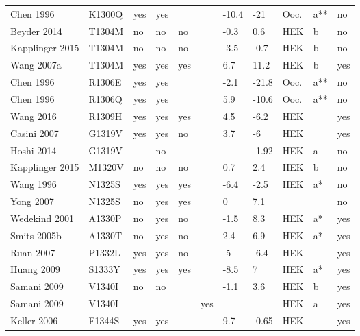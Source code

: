 \begin{tiny}
\begin{longtable}{p{4cm}|l|llll|ll|lll}
Chen 1996\cite{Chen1996MutationDB} & K1300Q & yes & yes &  &  & -10.4 & -21 & Ooc. & a** & no \\
Beyder 2014\cite{Beyder2014MutationDB} & T1304M & no & no & no &  & -0.3 & 0.6 & HEK & b & no \\
Kapplinger 2015\cite{Kapplinger2015MutationDB} & T1304M & no & no & no &  & -3.5 & -0.7 & HEK & b & no \\
Wang 2007a\cite{Wang2007aMutationDB} & T1304M & yes & yes & yes &  & 6.7 & 11.2 & HEK & b & yes \\
Chen 1996\cite{Chen1996MutationDB} & R1306E & yes & yes &  &  & -2.1 & -21.8 & Ooc. & a** & no \\
Chen 1996\cite{Chen1996MutationDB} & R1306Q & yes & yes &  &  & 5.9 & -10.6 & Ooc. & a** & no \\
Wang 2016\cite{Wang2016MutationDB} & R1309H & yes & yes & yes &  & 4.5 & -6.2 & HEK &  & yes \\
Casini 2007\cite{Casini2007MutationDB} & G1319V & yes & yes & no &  & 3.7 & -6 & HEK &  & yes \\
Hoshi 2014\cite{Hoshi2014MutationDB} & G1319V &  & no &  &  &  & -1.92 & HEK & a & no \\
Kapplinger 2015\cite{Kapplinger2015MutationDB} & M1320V & no & no & no &  & 0.7 & 2.4 & HEK & b & no \\
Wang 1996\cite{Wang1996MutationDB} & N1325S & yes & yes & yes &  & -6.4 & -2.5 & HEK & a* & no \\
Yong 2007\cite{Yong2007MutationDB} & N1325S & no & yes & yes &  & 0 & 7.1 &  &  & no \\
Wedekind 2001\cite{Wedekind2001MutationDB} & A1330P & no & yes & no &  & -1.5 & 8.3 & HEK & a* & yes \\
Smits 2005b\cite{Smits2005bMutationDB} & A1330T & no & yes & no &  & 2.4 & 6.9 & HEK & a* & yes \\
Ruan 2007\cite{Ruan2007MutationDB} & P1332L & yes & yes & no &  & -5 & -6.4 & HEK &  & yes \\
Huang 2009\cite{Huang2009MutationDB} & S1333Y & yes & yes & yes &  & -8.5 & 7 & HEK & a* & yes \\
Samani 2009\cite{Samani2009MutationDB} & V1340I & no & no &  &  & -1.1 & 3.6 & HEK & b & yes \\
Samani 2009\cite{Samani2009MutationDB} & V1340I &  &  &  & yes &  &  & HEK & a & yes \\
Keller 2006\cite{Keller2006MutationDB} & F1344S & yes & yes &  &  & 9.7 & -0.65 & HEK &  & yes \\

\end{longtable}
\end{tiny}
